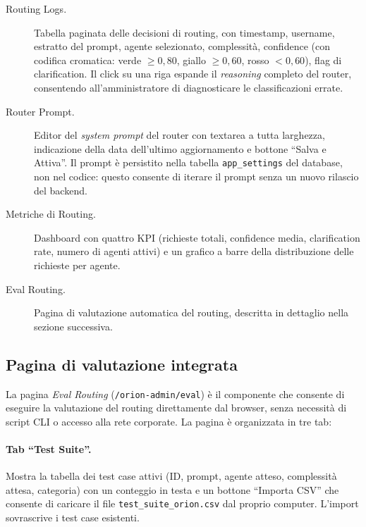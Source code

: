\begin{description}
  \item[Routing Logs.] Tabella paginata delle decisioni di routing, con timestamp, username, estratto del prompt, 
  agente selezionato, complessità, confidence (con codifica cromatica: verde $\geq 0{,}80$, giallo $\geq 0{,}60$, rosso $< 0{,}60$), flag di clarification. Il click su una riga espande il \emph{reasoning} completo del router, consentendo all'amministratore di diagnosticare le classificazioni errate.

  \item[Router Prompt.] Editor del \emph{system prompt} del router con textarea a tutta larghezza, 
  indicazione della data dell'ultimo aggiornamento e bottone ``Salva e Attiva''. 
  Il prompt è persistito nella tabella \texttt{app\_settings} del database, non nel codice: 
  questo consente di iterare il prompt senza un nuovo rilascio del backend.

  \item[Metriche di Routing.] Dashboard con quattro KPI (richieste totali, confidence media, clarification rate, numero di agenti attivi) 
  e un grafico a barre della distribuzione delle richieste per agente.

  \item[Eval Routing.] Pagina di valutazione automatica del routing, descritta in dettaglio nella sezione successiva.
\end{description}

\subsection{Pagina di valutazione integrata}
\label{subsec:orion-impl-eval}

La pagina \emph{Eval Routing} (\texttt{/orion-admin/eval}) è il componente che consente di eseguire la valutazione del routing direttamente dal browser, 
senza necessità di script CLI o accesso alla rete corporate. La pagina è organizzata in tre tab:

\paragraph{Tab ``Test Suite''.} Mostra la tabella dei test case attivi (ID, prompt, agente atteso, complessità attesa, categoria) 
con un conteggio in testa e un bottone ``Importa CSV'' che consente di caricare il file \texttt{test\_suite\_orion.csv} dal proprio computer. 
L'import sovrascrive i test case esistenti.

